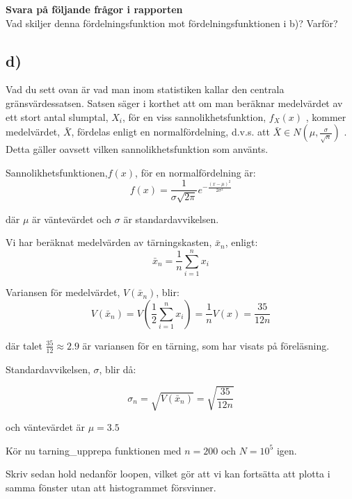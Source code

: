 \documentclass[a4paper]{article}
\begin{document}
\textbf{Svara på följande frågor i rapporten}\\
Vad skiljer denna fördelningsfunktion mot fördelningsfunktionen i b)? Varför?

\subsection{d)}
Vad du sett ovan är vad man inom statistiken kallar den centrala gränsvärdessatsen.
Satsen säger i korthet att om man beräknar medelvärdet av ett stort antal slumptal,
\( X_i \), för en viss sannolikhetsfunktion, \(f_X(x)\) , kommer medelvärdet, \(\bar{X}\),
fördelas enligt en normalfördelning, d.v.s. att \(\bar{X} \in N(\mu,\frac{\sigma}{\sqrt{n}})\) . Detta gäller oavsett
vilken sannolikhetsfunktion som använts.


Sannolikhetsfunktionen,\(f(x)\), för en normalfördelning är:
\begin{equation} \label{eqn:normf}
f(x)=\frac{1}{\sigma\sqrt{2\pi}}e^{-\frac{(x-\mu)^2}{2\sigma^2}}
\end{equation}

där \( \mu \) är väntevärdet och \( \sigma \) är standardavvikelsen. 

Vi har beräknat medelvärden av tärningskasten, \( \bar{x}_n \), enligt:
\begin{equation} \label{eqn:tarning_medel}
    \bar{x}_n = \frac{1}{n}\sum_{i=1}^n x_i
\end{equation}

Variansen för medelvärdet, \( V(\bar{x}_n) \), blir:
\begin{equation} \label{eqn:varians}
    V(\bar{x}_n)=V\left(\frac{1}{2}\sum_{i=1}^nx_i\right)= \frac{1}{n}V(x)=\frac{35}{12n}
\end{equation}

där talet \( \frac{35}{12}\approx 2.9 \) är variansen för en tärning, som har visats på föreläsning.

Standardavvikelsen, \( \sigma \), blir då:

\begin{equation} \label{eqn:stdev}
    \sigma_n=\sqrt{V(\bar{x}_n)}=\sqrt{\frac{35}{12n}}
\end{equation}

och väntevärdet är \( \mu=3.5 \) 

Kör nu tarning\_upprepa funktionen med \( n=200 \) och \( N=10^5 \) igen. 

Skriv sedan hold nedanför loopen, vilket gör att vi kan fortsätta att plotta 
i samma fönster utan att histogrammet försvinner. 
\end{document}

